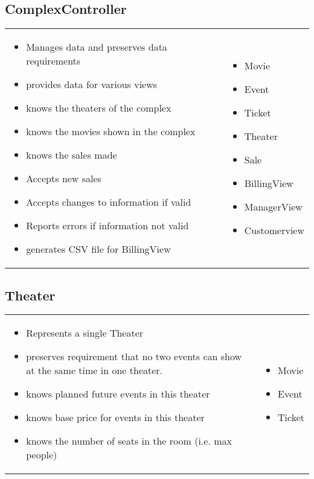 \documentclass[12pt,titlepage,letterpaper]{article}
\begin{document}
\subsection{ComplexController}
\begin{tabular}{p{}|p{}}
\begin{itemize}
\item Manages data and preserves data requirements
\item provides data for various views
\item knows the theaters of the complex
\item knows the movies shown in the complex
\item knows the sales made
\item Accepts new sales
\item Accepts changes to information if valid
\item Reports errors if information not valid
\item generates CSV file for BillingView
\end{itemize} &
\begin{itemize}
\item Movie
\item Event
\item Ticket
\item Theater
\item Sale
\item BillingView
\item ManagerView
\item Customerview
\end{itemize}
\end{tabular} 
\subsection{Theater}
\begin{tabular}{p{}|p{}}
\begin{itemize}
\item Represents a single Theater
\item preserves requirement that no two events can show at the same time in one theater.
\item knows planned future events in this theater
\item knows base price for events in this theater
\item knows the number of seats in the room (i.e. max people)
\end{itemize} &
\begin{itemize}
\item Movie
\item Event
\item Ticket
\end{itemize}
\end{tabular} 
\end{document}
